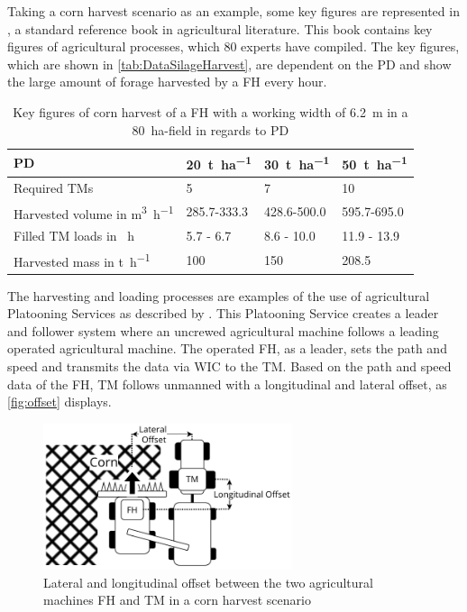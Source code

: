 Taking a corn harvest scenario as an example, some key figures are represented in \cite{faustzahlen2018}, a standard reference book in agricultural literature. This book contains key figures of agricultural processes, which 80 experts have compiled.
The key figures, which are shown in \autoref{tab:DataSilageHarvest}, are dependent on the \ac{PD} and show the large amount of forage harvested by a \ac{FH} every hour.
\begin{table}[H]
	\centering
	\begin{tabular}{>{\raggedright}p{4.9cm}p{1.8cm}p{1.8cm}p{1.8cm}}
		\toprule
  		\acf{PD}&\SI{20}{\tonne\per\hectare}&\SI{30}{\tonne\per\hectare} & \SI{50}{\tonne\per\hectare}\\
		\midrule
		Required \acl{TM}s & \num{5}&
		\num{7} & \num{10} \\
		Harvested volume in \si{\cubic\metre\per\hour} &
		\num{285.7}-\num{333.3}
		& \num{428.6}-\num{500.0} &
		\num{595.7}-\num{695.0}\\
		Filled \acl{TM} loads in \si{\per\hour} &
		\num{5.7} - \num{6.7}
		& \num{8.6} - \num{10.0} &
		\num{11.9} - \num{13.9}\\
		Harvested mass in \si{\tonne\per\hour} & \num{100}
		& \num{150} &
		\num{208.5} \\
		\bottomrule
	\end{tabular}
	\caption{Key figures of corn harvest of a \acf{FH} with a working width of \SI{6.2}{\metre} in a \SI{80}{\hectare}-field in regards to \acf{PD}  \cite{faustzahlen2018}}
	\label{tab:DataSilageHarvest}
\end{table}

The harvesting and loading processes are examples of the use of agricultural Platooning Services as described by
\textcite{zhang_method_2009}.
This Platooning Service creates a leader and follower system where an uncrewed agricultural machine follows a leading operated agricultural machine.
The operated \ac{FH}, as a leader, sets the path and speed and transmits the data via \ac{WIC} to the \ac{TM}. Based on the path and speed data of the \ac{FH}, \ac{TM} follows unmanned with a longitudinal and lateral offset, as \autoref{fig:offset} displays.
\begin{figure}[H]
	\centering
	\includegraphics[width=0.65\textwidth]{figures/offset_platoon.pdf}
	\caption{Lateral and longitudinal offset between the two agricultural machines \acf{FH} and \acf{TM} in a corn harvest scenario}%
	\label{fig:offset}%
\end{figure}

